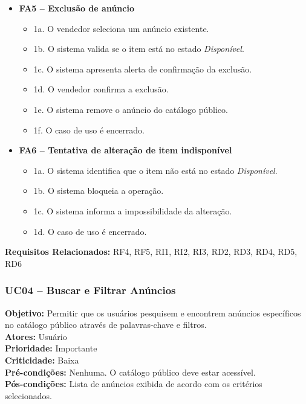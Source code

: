 ﻿\documentclass[12pt,a4paper]{article}
\begin{document}
\begin{itemize}[leftmargin=*]
    \item \textbf{FA5 – Exclusão de anúncio}
    \begin{itemize}[label={}, leftmargin=0.5cm]
        \item 1a. O vendedor seleciona um anúncio existente.
        \item 1b. O sistema valida se o item está no estado \textit{Disponível}.
        \item 1c. O sistema apresenta alerta de confirmação da exclusão.
        \item 1d. O vendedor confirma a exclusão.
        \item 1e. O sistema remove o anúncio do catálogo público.
        \item 1f. O caso de uso é encerrado.
    \end{itemize}

    \item \textbf{FA6 – Tentativa de alteração de item indisponível}
    \begin{itemize}[label={}, leftmargin=0.5cm]
        \item 1a. O sistema identifica que o item não está no estado \textit{Disponível}.
        \item 1b. O sistema bloqueia a operação.
        \item 1c. O sistema informa a impossibilidade da alteração.
        \item 1d. O caso de uso é encerrado.
    \end{itemize}
\end{itemize}

\vspace{0.5em}
\noindent\textbf{Requisitos Relacionados:} RF4, RF5, RI1, RI2, RI3, RD2, RD3, RD4, RD5, RD6


\subsubsection{UC04 – Buscar e Filtrar Anúncios}
\label{uc:08}
\noindent\textbf{Objetivo:} Permitir que os usuários pesquisem e encontrem anúncios específicos no catálogo público através de palavras-chave e filtros.\\
\textbf{Atores:} Usuário\\
\textbf{Prioridade:} Importante\\
\textbf{Criticidade:} Baixa\\
\textbf{Pré-condições:} Nenhuma. O catálogo público deve estar acessível.\\
\textbf{Pós-condições:} Lista de anúncios exibida de acordo com os critérios selecionados.
\end{document}
